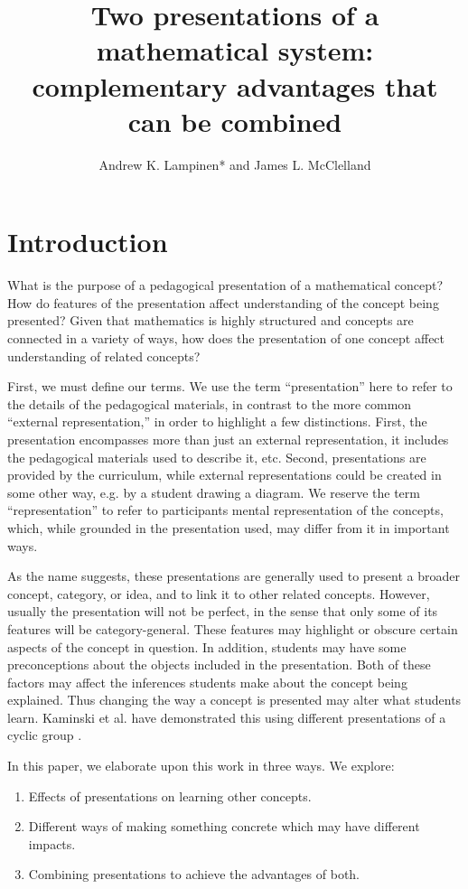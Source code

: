 \documentclass[man,10pt]{apa6}
\title{Two presentations of a mathematical system: complementary advantages that can be combined}
\author{Andrew K. Lampinen* and James L. McClelland}
\affiliation{Department of Psychology, Stanford University}
\date{}
\begin{document}
\maketitle
\section{Introduction}
What is the purpose of a pedagogical presentation of a mathematical concept? How do features of the presentation affect understanding of the concept being presented? Given that mathematics is highly structured and concepts are connected in a variety of ways, how does the presentation of one concept affect understanding of related concepts?  \par
First, we must define our terms. We use the term ``presentation'' here to refer to the details of the pedagogical materials, in contrast to the more common ``external representation,'' in order to highlight a few distinctions. First, the presentation encompasses more than just an external representation, it includes the pedagogical materials used to describe it, etc. Second, presentations are provided by the curriculum, while external representations could be created in some other way, e.g. by a student drawing a diagram. We reserve the term ``representation'' to refer to participants mental representation of the concepts, which, while grounded in the presentation used, may differ from it in important ways. \par
As the name suggests, these presentations are generally used to present a broader concept, category, or idea, and to link it to other related concepts. However, usually the presentation will not be perfect, in the sense that only some of its features will be category-general. These features may highlight or obscure certain aspects of the concept in question. In addition, students may have some preconceptions about the objects included in the presentation. Both of these factors may affect the inferences students make about the concept being explained. Thus changing the way a concept is presented may alter what students learn. Kaminski et al. have demonstrated this using different presentations of a cyclic group \cite{Kaminski2008}. \par
In this paper, we elaborate upon this work in three ways. We explore:
\begin{enumerate}
\item Effects of presentations on learning other concepts.
\item Different ways of making something concrete which may have different impacts. 
\item Combining presentations to achieve the advantages of both.
\end{enumerate}
\end{document}
